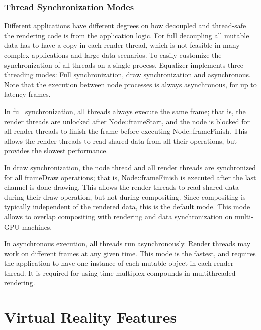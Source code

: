 \documentclass[10pt,journal,compsoc]{IEEEtran}
\begin{document}
\subsubsection{Thread Synchronization Modes}\label{sec:threading}

Different applications have different degrees on how decoupled and thread-safe
the rendering code is from the application logic. For full decoupling all
mutable data has to have a copy in each render thread, which is not feasible in
many complex applications and large data scenarios. To easily customize the
synchronization of all threads on a single process, \textsf{Equalizer}
implements three threading modes:  Full synchronization, draw synchronization
and asynchronous. Note that the execution between node processes is always
asynchronous, for up to \textsf{latency} frames.

In full synchronization, all threads always execute the same frame; that is, the
render threads are unlocked after \textsf{Node::frameStart}, and the node is
blocked for all render threads to finish the frame before executing
\textsf{Node::frameFinish}. This allows the render threads to read shared data
from all their operations, but provides the slowest performance.

In draw synchronization, the node thread and all render threads are synchronized
for all \textsf{frameDraw} operations; that is, \textsf{Node::frameFinish} is
executed after the last channel is done drawing. This allows the render threads
to read shared data during their draw operation, but not during compositing.
Since compositing is typically independent of the rendered data, this is the
default mode. This mode allows to overlap compositing with rendering and data
synchronization on multi-GPU machines.

In asynchronous execution, all threads run asynchronously. Render threads may
work on different frames at any given time. This mode is the fastest, and
requires the application to have one instance of each mutable object in each
render thread. It is required for using time-multiplex compounds in
multithreaded rendering.

\section{Virtual Reality Features}
\end{document}
